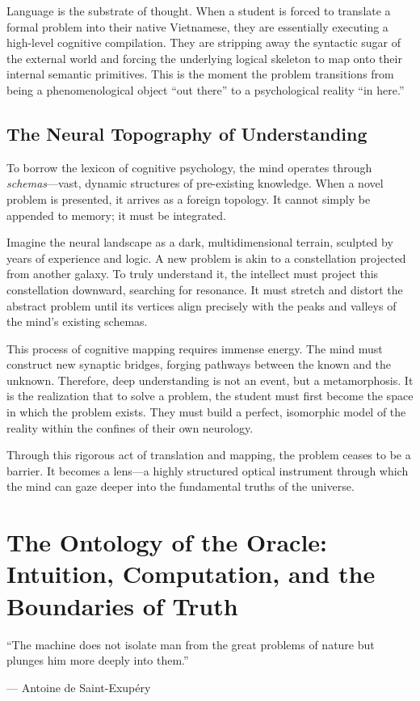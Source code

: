 \documentclass[11pt,a4paper,oneside]{book}
\theoremstyle{definition}
\theoremstyle{remark}
\begin{document}
Language is the substrate of thought. When a student is forced to translate a formal problem into their native Vietnamese, they are essentially executing a high-level cognitive compilation. They are stripping away the syntactic sugar of the external world and forcing the underlying logical skeleton to map onto their internal semantic primitives. This is the moment the problem transitions from being a phenomenological object ``out there'' to a psychological reality ``in here.''

\section{The Neural Topography of Understanding}
To borrow the lexicon of cognitive psychology, the mind operates through \textit{schemas}---vast, dynamic structures of pre-existing knowledge. When a novel problem is presented, it arrives as a foreign topology. It cannot simply be appended to memory; it must be integrated. 

Imagine the neural landscape as a dark, multidimensional terrain, sculpted by years of experience and logic. A new problem is akin to a constellation projected from another galaxy. To truly understand it, the intellect must project this constellation downward, searching for resonance. It must stretch and distort the abstract problem until its vertices align precisely with the peaks and valleys of the mind's existing schemas. 

This process of cognitive mapping requires immense energy. The mind must construct new synaptic bridges, forging pathways between the known and the unknown. Therefore, deep understanding is not an event, but a metamorphosis. It is the realization that to solve a problem, the student must first become the space in which the problem exists. They must build a perfect, isomorphic model of the reality within the confines of their own neurology.

Through this rigorous act of translation and mapping, the problem ceases to be a barrier. It becomes a lens---a highly structured optical instrument through which the mind can gaze deeper into the fundamental truths of the universe.

\chapter{The Ontology of the Oracle: Intuition, Computation, and the Boundaries of Truth}
\epigraph{``The machine does not isolate man from the great problems of nature but plunges him more deeply into them.''}{--- Antoine de Saint-Exupéry}
\end{document}
